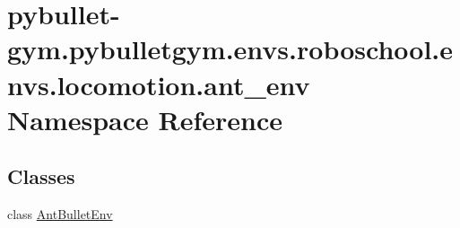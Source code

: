 \hypertarget{namespacepybullet-gym_1_1pybulletgym_1_1envs_1_1roboschool_1_1envs_1_1locomotion_1_1ant__env}{}\section{pybullet-\/gym.pybulletgym.\+envs.\+roboschool.\+envs.\+locomotion.\+ant\+\_\+env Namespace Reference}
\label{namespacepybullet-gym_1_1pybulletgym_1_1envs_1_1roboschool_1_1envs_1_1locomotion_1_1ant__env}
\subsection*{Classes}
\begin{DoxyCompactItemize}
\item 
class \hyperlink{classpybullet-gym_1_1pybulletgym_1_1envs_1_1roboschool_1_1envs_1_1locomotion_1_1ant__env_1_1_ant_bullet_env}{Ant\+Bullet\+Env}
\end{DoxyCompactItemize}
